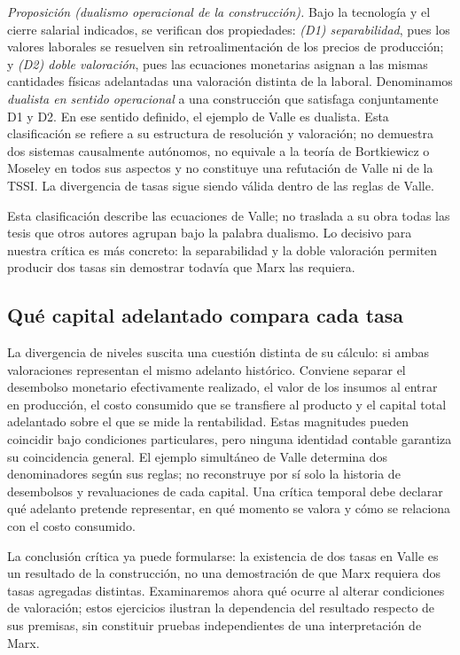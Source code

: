 \documentclass[10pt,twoside]{article}
\begin{document}
\noindent\textit{Proposición (dualismo operacional de la construcción).} Bajo la tecnología y el cierre salarial indicados, se verifican dos propiedades: \emph{(D1) separabilidad}, pues los valores laborales se resuelven sin retroalimentación de los precios de producción; y \emph{(D2) doble valoración}, pues las ecuaciones monetarias asignan a las mismas cantidades físicas adelantadas una valoración distinta de la laboral. Denominamos \emph{dualista en sentido operacional} a una construcción que satisfaga conjuntamente D1 y D2. En ese sentido definido, el ejemplo de Valle es dualista. Esta clasificación se refiere a su estructura de resolución y valoración; no demuestra dos sistemas causalmente autónomos, no equivale a la teoría de Bortkiewicz o Moseley en todos sus aspectos y no constituye una refutación de Valle ni de la TSSI. La divergencia de tasas sigue siendo válida dentro de las reglas de Valle.

Esta clasificación describe las ecuaciones de Valle; no traslada a su obra todas las tesis que otros autores agrupan bajo la palabra dualismo. Lo decisivo para nuestra crítica es más concreto: la separabilidad y la doble valoración permiten producir dos tasas sin demostrar todavía que Marx las requiera.



\subsection*{Qué capital adelantado compara cada tasa}
La divergencia de niveles suscita una cuestión distinta de su cálculo: si ambas valoraciones representan el mismo adelanto histórico. Conviene separar el desembolso monetario efectivamente realizado, el valor de los insumos al entrar en producción, el costo consumido que se transfiere al producto y el capital total adelantado sobre el que se mide la rentabilidad. Estas magnitudes pueden coincidir bajo condiciones particulares, pero ninguna identidad contable garantiza su coincidencia general. El ejemplo simultáneo de Valle determina dos denominadores según sus reglas; no reconstruye por sí solo la historia de desembolsos y revaluaciones de cada capital. Una crítica temporal debe declarar qué adelanto pretende representar, en qué momento se valora y cómo se relaciona con el costo consumido.

La conclusión crítica ya puede formularse: la existencia de dos tasas en Valle es un resultado de la construcción, no una demostración de que Marx requiera dos tasas agregadas distintas. Examinaremos ahora qué ocurre al alterar condiciones de valoración; estos ejercicios ilustran la dependencia del resultado respecto de sus premisas, sin constituir pruebas independientes de una interpretación de Marx.
\end{document}
